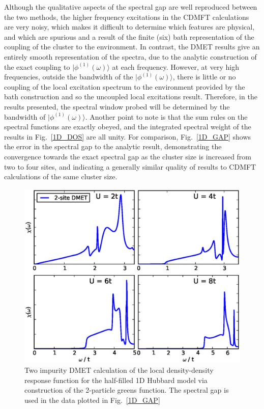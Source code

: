 \documentclass[aps,showpacs,twocolumn,nobibnotes]{revtex4}
\begin{document}
Although the qualitative aspects of the spectral gap are well reproduced between the two methods, the higher frequency excitations in the CDMFT calculations are very noisy, which makes it difficult to determine 
which features are physical, and which are spurious and a result of the finite (six) bath representation of the coupling of the cluster to the environment. In contrast, the DMET results give an entirely smooth
representation of the spectra, due to the analytic construction of the exact coupling to $|\phi^{(1)}(\omega)\rangle$ at each frequency. However, at very high frequencies, outside the bandwidth of the 
$|\phi^{(1)}(\omega)\rangle$, there is little or no coupling of the local excitation spectrum to the environment provided by the bath construction and so the uncoupled local excitations result. 
Therefore, in the results presented, the spectral window probed will be determined by the bandwidth of $|\phi^{(1)}(\omega)\rangle$. Another point to note is that the sum rules on the spectral functions are
exactly obeyed, and the integrated spectral weight of the results in Fig.~\ref{1D_DOS} are all unity.
For comparison, Fig.~\ref{1D_GAP} shows the error in the spectral gap to the analytic result\cite{Ovchinni1970}, demonstrating the convergence towards the exact spectral gap as the cluster size is increased 
from two to four sites, and indicating a generally similar quality of results to CDMFT calculations of the same cluster size.

\begin{figure}
\begin{center}
    \vspace{-2mm}
\includegraphics[scale=0.475]{Plots/1D_DD/1D_Hub_DD.eps}
\end{center}
    \vspace{-8mm}
\caption{Two impurity DMET calculation of the local density-density response function for the half-filled 1D Hubbard model via construction of the 2-particle greens function.
The spectral gap is used in the data plotted in Fig.~\ref{1D_GAP}}
\label{1D_DD}
\end{figure}
\end{document}
